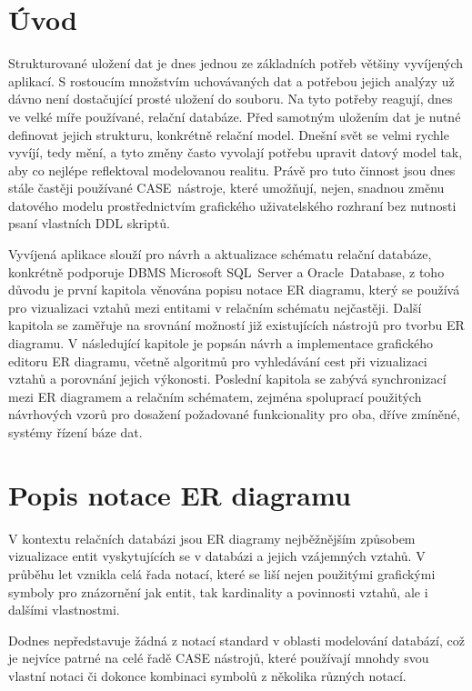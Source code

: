 \documentclass[czech,bachelor,public,dept460,male,oneside]{diploma}
\begin{document}
\MakeTitlePages

\lstlistoflistings

\section{Úvod}
Strukturované uložení dat je dnes jednou ze základních potřeb většiny vyvíjených aplikací. S rostoucím množstvím uchovávaných dat a potřebou jejich analýzy už dávno není dostačující prosté uložení do souboru. Na tyto potřeby reagují, dnes ve velké míře používané, relační databáze. Před samotným uložením dat je nutné definovat jejich strukturu, konkrétně relační model. Dnešní svět se velmi rychle vyvíjí, tedy mění, a tyto změny často vyvolají potřebu upravit datový model tak, aby co nejlépe reflektoval modelovanou realitu. Právě pro tuto činnost jsou dnes stále častěji používané CASE~nástroje, které umožňují, nejen, snadnou změnu datového modelu prostřednictvím grafického uživatelského rozhraní bez nutnosti psaní vlastních DDL skriptů.

Vyvíjená aplikace slouží pro návrh a aktualizace schématu relační databáze, konkrétně podporuje DBMS Microsoft SQL~Server a Oracle~Database, z toho důvodu je první kapitola věnována popisu notace ER diagramu, který se používá pro vizualizaci vztahů mezi entitami v relačním schématu nejčastěji. Další kapitola se zaměřuje na srovnání možností již existujících nástrojů pro tvorbu ER diagramu. V následující kapitole je popsán návrh a implementace grafického editoru ER diagramu, včetně algoritmů pro vyhledávání cest při vizualizaci vztahů a porovnání jejich výkonosti. Poslední kapitola se zabývá synchronizací mezi ER diagramem a relačním schématem, zejména spoluprací použitých návrhových vzorů pro dosažení požadované funkcionality pro oba, dříve zmíněné, systémy řízení báze dat.

\section{Popis notace ER diagramu}
V kontextu relačních databázi jsou ER diagramy nejběžnějším způsobem vizualizace entit vyskytujících se v databázi a jejich vzájemných vztahů. V průběhu let vznikla celá řada notací, které se liší nejen použitými grafickými symboly pro znázornění jak entit, tak kardinality a povinnosti vztahů, ale i dalšími vlastnostmi.

Dodnes nepředstavuje žádná z notací standard v oblasti modelování databází, což je nejvíce patrné na celé řadě CASE nástrojů, které používají mnohdy svou vlastní notaci či dokonce kombinaci symbolů z několika různých notací.
\end{document}
